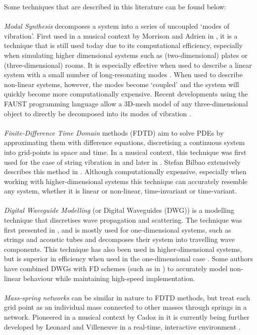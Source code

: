 Some techniques that are described in this literature can be found below:
\\
\\
\textit{Modal Synthesis} decomposes a system into a series of uncoupled `modes of vibration'. First used in a musical context by Morrison and Adrien in \cite{Morrison1993}, it is a technique that is still used today due to its computational efficiency, especially when simulating higher dimensional systems such as (two-dimensional) plates or (three-dimensional) rooms. It is especially effective when used to describe a linear system \cite{Bilbao2018} with a small number of long-resonating modes \cite{Smith2010a}. When used to describe non-linear systems, however, the modes become `coupled’ and the system will quickly become more computationally expensive. Recent developments using the FAUST programming language allow a 3D-mesh model of any three-dimensional object to directly be decomposed into its modes of vibration \cite{MichonMesh2Faust2017}.
\\
\\
\textit{Finite-Difference Time Domain} methods (FDTD) aim to solve PDEs by approximating them with difference equations, discretising a continuous system into grid-points in space and time. In a musical context, this technique was first used for the case of string vibration in \cite{Ruiz1969, Hiller1971I, Hiller1971II} and later in \cite{Chaigne1992, Chaigne1994}. Stefan Bilbao extensively describes this method in \cite{theBible, Bilbao2018}. Although computationally expensive, especially when working with higher-dimensional systems this technique can accurately resemble any system, whether it is linear or non-linear, time-invariant or time-variant.
\\
\\
\textit{Digital Waveguide Modelling} (or Digital Waveguides (DWG)) is a modelling technique that discretises wave propagation and scattering. The technique was first presented in \cite{Smith1992}, and is mostly used for one-dimensional systems, such as strings and acoustic tubes and decomposes their system into travelling wave components. This technique has also been used in higher-dimensional systems, but is superior in efficiency when used in the one-dimensional case \cite{Valimaki2006}. Some authors have combined DWGs with FD schemes (such as in \cite{Erkut2002, Maestre2014}) to accurately model non-linear behaviour while maintaining high-speed implementation.
\\
\\
\textit{Mass-spring networks} can be similar in nature to FDTD methods, but treat each grid point as an individual mass connected to other masses through springs in a network. Pioneered in a musical context by Cadoz in \cite{Cadoz1979, Cadoz1983, Cadoz1993} it is currently being further developed by Leonard and Villeneuve in a real-time, interactive environment \cite{Villeneuve2019, Leonard2019}.

